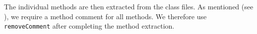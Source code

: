 \documentclass[%
class=scrreprt,
chapterprefix=false,%
open=right,%
twoside=false,%
paper=a4,%
logofile={Logo\_zentral\_farbig\_EN.png},%
thesistype=master,%
UKenglish,%
]{se2thesis}
\theoremstyle{definition}
\newcommand{\Mods}{Modificatations\xspace}
\newcommand{\RDHs}{Readability Decreasing \Mods\xspace}
\newcommand{\rdhs}{RDMs\xspace}
\def\checkmark{\tikz\fill[scale=0.4](0,.35) -- (.25,0) -- (1,.7) -- (.25,.15) -- cycle;}
\begin{document}
	
	The individual methods are then extracted from the class files. As mentioned (see ), we require a method comment for all methods. We therefore use \texttt{removeComment} after completing the method extraction.
	
\end{document}
